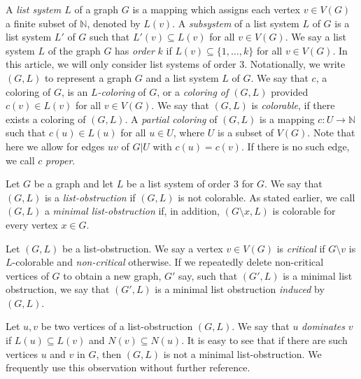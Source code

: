 \documentclass[11pt]{article}
\begin{document}
A \emph{list system $L$} of a graph $G$ is a mapping which assigns each vertex $v\in V(G)$ a finite subset of $\mathbb{N}$, denoted by $L(v)$. 
A \emph{subsystem} of a list system $L$ of $G$ is a list system $L'$ of $G$ such that $L'(v)\subseteq L(v)$ for all $v\in V(G)$. 
We say a list system $L$ of the graph $G$ has \emph{order} $k$ if $L(v)\subseteq \{1,\ldots,k\}$ for all $v\in V(G)$. 
In this article, we will only consider list systems of order $3$.
Notationally, we write $(G,L)$ to represent a graph $G$ and a list system $L$ of $G$. 
We say that $c$, a coloring of $G$, is an \emph{$L$-coloring} of $G$, or a \emph{coloring of $(G,L)$} provided $c(v)\in L(v)$ for all $v\in V(G)$. 
We say that $(G,L)$ is \emph{colorable}, if there exists a coloring of $(G,L)$. 
A \emph{partial coloring} of $(G,L)$  is a mapping $c:U \to \mathbb N$ such that $c(u) \in L(u)$ for all $u \in U$, where $U$ is a subset of $V(G)$.
Note that here we allow for edges $uv$ of $G|U$ with $c(u)=c(v)$.
If there is no such edge, we call $c$ \emph{proper}.
	
Let $G$ be a graph and let $L$ be a list system of order $3$ for $G$.
We say that $(G,L)$ is a \emph{list-obstruction} if $(G,L)$ is not colorable.
As stated earlier, we call $(G,L)$ a \emph{minimal list-obstruction} if, in addition,  $(G\setminus x,L)$ is colorable for every vertex $x\in G$.

Let $(G,L)$ be a list-obstruction.
We say a vertex $v\in V(G)$ is \emph{critical} if $G\setminus v$ is $L$-colorable and \emph{non-critical} otherwise.
If we repeatedly delete non-critical vertices of $G$ to obtain a new 
graph, $G'$ say, such that 
$(G',L)$ is a minimal list obstruction, we say that
$(G',L)$ is a minimal list obstruction \emph{induced} by $(G,L)$.

Let $u,v$ be two vertices of a list-obstruction $(G,L)$.
We say that $u$ \emph{dominates} $v$ if $L(u) \subseteq L(v)$ and $N(v) \subseteq N(u)$.
It is easy to see that if there are such vertices $u$ and $v$ in $G$, then $(G,L)$ is not  a minimal list-obstruction.
We frequently use this observation without further reference.

\end{document}
